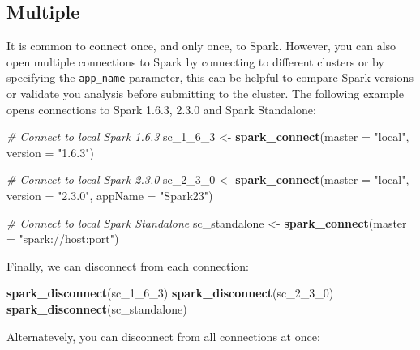 \documentclass[]{book}
\newenvironment{Shaded}{\begin{snugshade}}{\end{snugshade}}
\newcommand{\CommentTok}[1]{\textcolor[rgb]{0.56,0.35,0.01}{\textit{#1}}}
\newcommand{\DataTypeTok}[1]{\textcolor[rgb]{0.13,0.29,0.53}{#1}}
\newcommand{\DecValTok}[1]{\textcolor[rgb]{0.00,0.00,0.81}{#1}}
\newcommand{\KeywordTok}[1]{\textcolor[rgb]{0.13,0.29,0.53}{\textbf{#1}}}
\newcommand{\NormalTok}[1]{#1}
\newcommand{\StringTok}[1]{\textcolor[rgb]{0.31,0.60,0.02}{#1}}
\theoremstyle{definition}
\theoremstyle{definition}
\theoremstyle{definition}
\theoremstyle{remark}
\begin{document}
\hypertarget{multiple}{%
\subsection{Multiple}\label{multiple}}

It is common to connect once, and only once, to Spark. However, you can
also open multiple connections to Spark by connecting to different
clusters or by specifying the \texttt{app\_name} parameter, this can be
helpful to compare Spark versions or validate you analysis before
submitting to the cluster. The following example opens connections to
Spark 1.6.3, 2.3.0 and Spark Standalone:

\begin{Shaded}
\begin{Highlighting}[]
\CommentTok{# Connect to local Spark 1.6.3}
\NormalTok{sc_}\DecValTok{1}\NormalTok{_}\DecValTok{6}\NormalTok{_}\DecValTok{3}\NormalTok{ <-}\StringTok{ }\KeywordTok{spark_connect}\NormalTok{(}\DataTypeTok{master =} \StringTok{"local"}\NormalTok{, }\DataTypeTok{version =} \StringTok{"1.6.3"}\NormalTok{)}

\CommentTok{# Connect to local Spark 2.3.0}
\NormalTok{sc_}\DecValTok{2}\NormalTok{_}\DecValTok{3}\NormalTok{_}\DecValTok{0}\NormalTok{ <-}\StringTok{ }\KeywordTok{spark_connect}\NormalTok{(}\DataTypeTok{master =} \StringTok{"local"}\NormalTok{, }\DataTypeTok{version =} \StringTok{"2.3.0"}\NormalTok{, }\DataTypeTok{appName =} \StringTok{"Spark23"}\NormalTok{)}

\CommentTok{# Connect to local Spark Standalone}
\NormalTok{sc_standalone <-}\StringTok{ }\KeywordTok{spark_connect}\NormalTok{(}\DataTypeTok{master =} \StringTok{"spark://host:port"}\NormalTok{)}
\end{Highlighting}
\end{Shaded}

Finally, we can disconnect from each connection:

\begin{Shaded}
\begin{Highlighting}[]
\KeywordTok{spark_disconnect}\NormalTok{(sc_}\DecValTok{1}\NormalTok{_}\DecValTok{6}\NormalTok{_}\DecValTok{3}\NormalTok{)}
\KeywordTok{spark_disconnect}\NormalTok{(sc_}\DecValTok{2}\NormalTok{_}\DecValTok{3}\NormalTok{_}\DecValTok{0}\NormalTok{)}
\KeywordTok{spark_disconnect}\NormalTok{(sc_standalone)}
\end{Highlighting}
\end{Shaded}

Alternatevely, you can disconnect from all connections at once:
\end{document}
